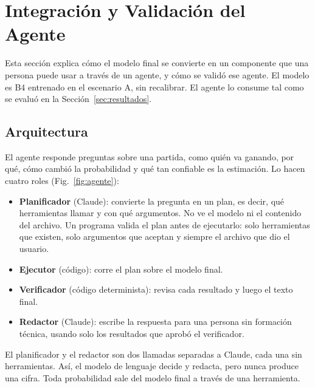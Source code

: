 
\section{Integración y Validación del Agente}
\label{sec:agente}

Esta sección explica cómo el modelo final se convierte en un componente que
una persona puede usar a través de un agente, y cómo se validó ese agente.
El modelo es B4 entrenado en el escenario A, sin recalibrar. El agente lo
consume tal como se evaluó en la Sección~\ref{sec:resultados}.

\subsection{Arquitectura}
\label{subsec:arquitectura}

El agente responde preguntas sobre una partida, como quién va ganando, por qué,
cómo cambió la probabilidad y qué tan confiable es la estimación. Lo hacen
cuatro roles (Fig.~\ref{fig:agente}):
\begin{itemize}
  \item \textbf{Planificador} (Claude): convierte la pregunta en un plan,
        es decir, qué herramientas llamar y con qué argumentos. No ve el
        modelo ni el contenido del archivo. Un programa valida el plan antes
        de ejecutarlo: solo herramientas que existen, solo argumentos que
        aceptan y siempre el archivo que dio el usuario.
  \item \textbf{Ejecutor} (código): corre el plan sobre el modelo final.
  \item \textbf{Verificador} (código determinista): revisa cada resultado
        y luego el texto final.
  \item \textbf{Redactor} (Claude): escribe la respuesta para una persona
        sin formación técnica, usando solo los resultados que aprobó el
        verificador.
\end{itemize}

El planificador y el redactor son dos llamadas separadas a Claude, cada una
sin herramientas. Así, el modelo de lenguaje decide y redacta, pero nunca
produce una cifra. Toda probabilidad sale del modelo final a través de una
herramienta.

